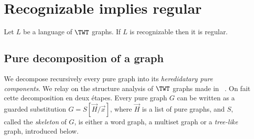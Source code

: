 \section{Recognizable implies regular}\label{app-sec:rec->reg}


\begin{theorem}\label{app-thm:Rec->Reg}
Let $L$ be a language of $\TWT$ graphs. If $L$ is recognizable then it is regular. 
\end{theorem}

\subsection{Pure decomposition of a graph}

We  decompose recursively every pure graph into its \emph{heredidatary pure components}. We relay on the structure analysis of $\TWT$ graphs made in ~\cite{Cosme-LlopezP17}.
On fait cette decomposition en deux étapes.  Every pure graph $G$ can be written as a guarded substitution $G=S[\vec{H}/\vec{x}]$,  where $\vec{H}$ is a list of pure graphs, and  $S$, called the \emph{skeleton} of $G$, is either a word graph,  a multiset graph or a \emph{tree-like} graph, introduced below. 


